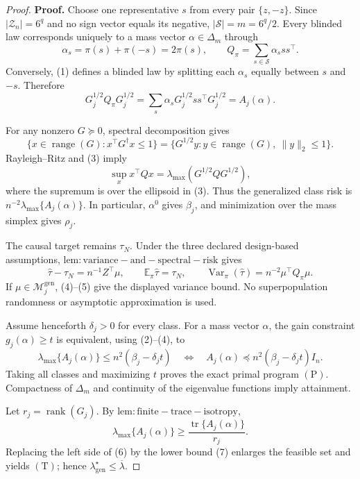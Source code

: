 \documentclass{article}
\begin{document}
\begin{proof}
\textbf{Proof.}
Choose one representative \(s\) from every pair \(\{z,-z\}\).  Since \(|\mathcal Z_n|=6^q\) and no sign vector equals its negative, \(|\mathscr S|=m=6^q/2\).  Every blinded law corresponds uniquely to a mass vector \(\alpha\in\Delta_m\) through
\[
\alpha_s=\pi(s)+\pi(-s)=2\pi(s),
\qquad
Q_\pi=\sum_{s\in\mathscr S}\alpha_sss^\top. \tag{1}
\]
Conversely, (1) defines a blinded law by splitting each \(\alpha_s\) equally between \(s\) and \(-s\).  Therefore
\[
G_j^{1/2}Q_\pi G_j^{1/2}
=\sum_s\alpha_sG_j^{1/2}ss^\top G_j^{1/2}
=A_j(\alpha). \tag{2}
\]

For any nonzero \(G\succeq0\), spectral decomposition gives
\[
\{x\in\operatorname{range}(G):x^\top G^\dagger x\le1\}
=\{G^{1/2}y:y\in\operatorname{range}(G),\ \|y\|_2\le1\}. \tag{3}
\]
Rayleigh--Ritz and (3) imply
\[
\sup_x x^\top Qx=\lambda_{\max}(G^{1/2}QG^{1/2}), \tag{4}
\]
where the supremum is over the ellipsoid in (3).  Thus the generalized class risk is \(n^{-2}\lambda_{\max}\{A_j(\alpha)\}\).  In particular, \(\alpha^0\) gives \(\beta_j\), and minimization over the mass simplex gives \(\rho_j\).

The causal target remains \(\tau_N\).  Under the three declared design-based assumptions, \(\mathrm{lem:variance-and-spectral-risk}\) gives
\[
\widehat\tau-\tau_N=n^{-1}Z^\top\mu,
\qquad
\mathbb E_\pi\widehat\tau=\tau_N,
\qquad
\operatorname{Var}_\pi(\widehat\tau)=n^{-2}\mu^\top Q_\pi\mu. \tag{5}
\]
If \(\mu\in\mathcal M_j^{\mathrm{gen}}\), (4)--(5) give the displayed variance bound.  No superpopulation randomness or asymptotic approximation is used.

Assume henceforth \(\delta_j>0\) for every class.  For a mass vector \(\alpha\), the gain constraint \(g_j(\alpha)\ge t\) is equivalent, using (2)--(4), to
\[
\lambda_{\max}\{A_j(\alpha)\}
\le n^2(\beta_j-\delta_jt)
\quad\Longleftrightarrow\quad
A_j(\alpha)\preceq n^2(\beta_j-\delta_jt)I_n. \tag{6}
\]
Taking all classes and maximizing \(t\) proves the exact primal program \((\mathrm P)\).  Compactness of \(\Delta_m\) and continuity of the eigenvalue functions imply attainment.

Let \(r_j=\operatorname{rank}(G_j)\).  By \(\mathrm{lem:finite-trace-isotropy}\),
\[
\lambda_{\max}\{A_j(\alpha)\}
\ge\frac{\operatorname{tr}\{A_j(\alpha)\}}{r_j}. \tag{7}
\]
Replacing the left side of (6) by the lower bound (7) enlarges the feasible set and yields \((\mathrm T)\); hence \(\lambda_{\mathrm{gen}}^\star\le\overline\lambda\).


\end{proof}
\end{document}
